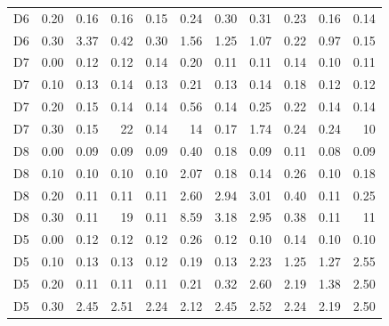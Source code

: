 \begin{table}[htbp]
{\begin{tabular}{llrrrrrrrrr}
D6 & 0.20 & 0.16 & 0.16 & 0.15 & 0.24 & 0.30 & 0.31 & 0.23 & 0.16 & 0.14 \\
D6 & 0.30 & 3.37 & 0.42 & 0.30 & 1.56 & 1.25 & 1.07 & 0.22 & 0.97 & 0.15 \\
D7 & 0.00 & 0.12 & 0.12 & 0.14 & 0.20 & 0.11 & 0.11 & 0.14 & 0.10 & 0.11 \\
D7 & 0.10 & 0.13 & 0.14 & 0.13 & 0.21 & 0.13 & 0.14 & 0.18 & 0.12 & 0.12 \\
D7 & 0.20 & 0.15 & 0.14 & 0.14 & 0.56 & 0.14 & 0.25 & 0.22 & 0.14 & 0.14 \\
D7 & 0.30 & 0.15 & 22 & 0.14 & 14 & 0.17 & 1.74 & 0.24 & 0.24 & 10 \\
D8 & 0.00 & 0.09 & 0.09 & 0.09 & 0.40 & 0.18 & 0.09 & 0.11 & 0.08 & 0.09 \\
D8 & 0.10 & 0.10 & 0.10 & 0.10 & 2.07 & 0.18 & 0.14 & 0.26 & 0.10 & 0.18 \\
D8 & 0.20 & 0.11 & 0.11 & 0.11 & 2.60 & 2.94 & 3.01 & 0.40 & 0.11 & 0.25 \\
D8 & 0.30 & 0.11 & 19 & 0.11 & 8.59 & 3.18 & 2.95 & 0.38 & 0.11 & 11 \\
D5 & 0.00 & 0.12 & 0.12 & 0.12 & 0.26 & 0.12 & 0.10 & 0.14 & 0.10 & 0.10 \\
D5 & 0.10 & 0.13 & 0.13 & 0.12 & 0.19 & 0.13 & 2.23 & 1.25 & 1.27 & 2.55 \\
D5 & 0.20 & 0.11 & 0.11 & 0.11 & 0.21 & 0.32 & 2.60 & 2.19 & 1.38 & 2.50 \\
D5 & 0.30 & 2.45 & 2.51 & 2.24 & 2.12 & 2.45 & 2.52 & 2.24 & 2.19 & 2.50 \\
\bottomrule
\end{tabular}}
\end{table}